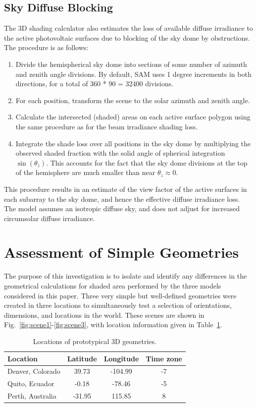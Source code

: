 \documentclass[twocolumn,10pt]{asme2ej}
\begin{document}
\subsection{Sky Diffuse Blocking}

The 3D shading calculator also estimates the loss of available diffuse irradiance to the active photovoltaic surfaces due to blocking of the sky dome by obstructions.  The procedure is as follows:
\begin{enumerate}
\item Divide the hemispherical sky dome into sections of some number of azimuth and zenith angle divisions.  By default, SAM uses 1 degree increments in both directions, for a total of 360 * 90 = 32400 divisions.
\item For each position, transform the scene to the solar azimuth and zenith angle.
\item Calculate the intersected (shaded) areas on each active surface polygon using the same procedure as for the beam irradiance shading loss.
\item Integrate the shade loss over all positions in the sky dome by multiplying the observed shaded fraction with the solid angle of spherical integration $\sin(\theta_z)$.  This accounts for the fact that the sky dome divisions at the top of the hemisphere are much smaller than near $\theta_z\approx 0$.
\end{enumerate}

This procedure results in an estimate of the view factor of the active surfaces in each subarray to the sky dome, and hence the effective diffuse irradiance loss.  The model assumes an isotropic diffuse sky, and does not adjust for increased circumsolar diffuse irradiance.


\section{Assessment of Simple Geometries}

The purpose of this investigation is to isolate and identify any differences in the geometrical calculations for shaded area performed by the three models considered in this paper.  Three very simple but well-defined geometries were created in three locations to simultaneously test a selection of orientations, dimensions, and locations in the world.  These scenes are shown in Fig.~\ref{fig:scene1}-\ref{fig:scene3}, with location information given in Table~\ref{tab:locations}.

\begin{table}[h!]
\begin{center}
\begin{tabular}{lccc}
Location & Latitude & Longitude & Time zone \\
\hline
Denver, Colorado & 39.73 & -104.99 & -7 \\
Quito, Ecuador & -0.18 & -78.46 & -5 \\
Perth, Australia & -31.95 & 115.85 & 8 \\
\end{tabular}
\caption{Locations of prototypical 3D geometries.}
\label{tab:locations}
\end{center}
\end{table}
\end{document}
